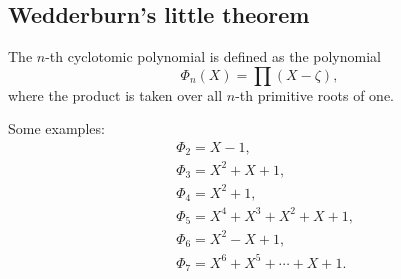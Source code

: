 






\subsection{Wedderburn's little theorem}

\begin{definition}
	The $n$-th cyclotomic polynomial 
	is defined as the polynomial
	\begin{equation}
		\label{eq:ciclotomico}
		\Phi_n(X)=\prod(X-\zeta),
	\end{equation}
	where the product is taken over all 
	$n$-th primitive roots of one. 
\end{definition}

Some examples:
	\begin{align*}
		&\Phi_2=X-1,\\
		&\Phi_3=X^2+X+1,\\
		&\Phi_4=X^2+1,\\
		&\Phi_5=X^4+X^3+X^2+X+1,\\
		&\Phi_6=X^2-X+1,\\
		&\Phi_7=X^6+X^5+\cdots+X+1.
	\end{align*}

